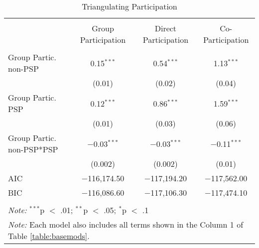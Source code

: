 
\begin{table}[!htbp] \centering 
  \caption{Triangulating Participation} 
  \label{table:partmods} 
\begin{tabular}{@{\extracolsep{5pt}}lccc} 
\\[-1.8ex]\hline \\[-1.8ex] 
 & Group Participation & Direct Participation & Co-Participation \\ 
\hline \\[-1.8ex] 
 Group Partic. non-PSP & 0.15$^{***}$ & 0.54$^{***}$ &1.13$^{***}$  \\ 
  & (0.01) & (0.02) & (0.04) \\ 
  Group Partic. PSP & 0.12$^{***}$ &0.86$^{***}$  & 1.59$^{***}$ \\ 
  & (0.01) & (0.03) &(0.06)  \\ 
  Group Partic. non-PSP*PSP & $-$0.03$^{***}$ &$-$0.03$^{***}$  & $-$0.11$^{***}$ \\ 
  & (0.002) & (0.002) & (0.01) \\ 
 AIC & $-$116,174.50 & $-$117,194.20 & $-$117,562.00 \\ 
BIC & $-$116,086.60 & $-$117,106.30 & $-$117,474.10 \\ 
\hline \\[-1.8ex] 
\multicolumn{4}{l}{\textit{Note:} $^{***}$p $<$ .01; $^{**}$p $<$ .05; $^{*}$p $<$ .1} \\ 
\multicolumn{4}{l}{\textit{Note:} Each model also includes all terms shown in the Column 1 of Table \ref{table:basemods}.} \\
\end{tabular} 
\end{table} 
